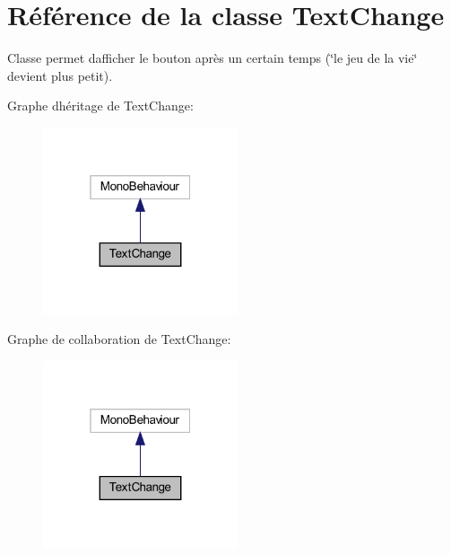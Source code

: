 \hypertarget{class_text_change}{}\section{Référence de la classe Text\+Change}
\label{class_text_change}


Classe permet d\textquotesingle{}afficher le bouton après un certain temps (\char`\"{}le jeu de la vie\char`\"{} devient plus petit).  




Graphe d\textquotesingle{}héritage de Text\+Change\+:\nopagebreak
\begin{figure}[H]
\begin{center}
\leavevmode
\includegraphics[width=163pt]{class_text_change__inherit__graph}
\end{center}
\end{figure}


Graphe de collaboration de Text\+Change\+:\nopagebreak
\begin{figure}[H]
\begin{center}
\leavevmode
\includegraphics[width=163pt]{class_text_change__coll__graph}
\end{center}
\end{figure}
